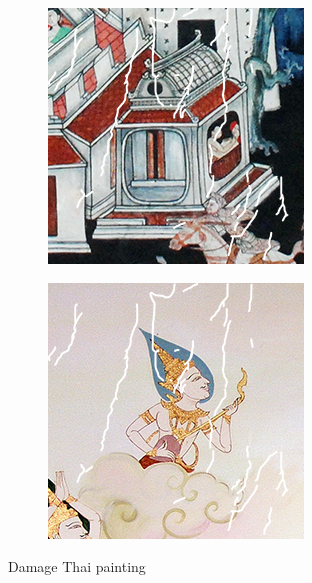\documentclass[xcolor=dvipsnames, xetex,serif]{beamer}
\begin{document}
\begin{frame}
\begin{figure}[H]
\begin{subfigure}{0.15\linewidth}
            \end{subfigure}
            \begin{subfigure}{0.15\linewidth}
                \centering
                \includegraphics[width=0.9\linewidth]{images/thaiart/case04-toinpaint.png}			
            \end{subfigure}
            \begin{subfigure}{0.15\linewidth}
                \centering
                \includegraphics[width=0.9\linewidth]{images/thaiart/case05-toinpaint.png}			
            \end{subfigure}
            \caption{Damage Thai painting}
        \end{figure}
    \end{frame}
\end{document}
